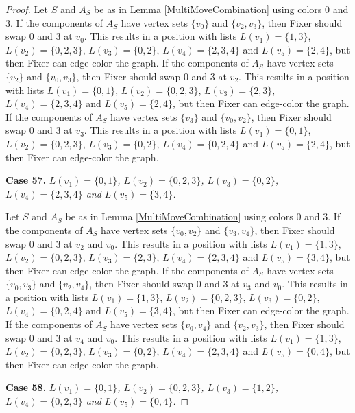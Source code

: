\documentclass[12pt]{amsart}
\theoremstyle{plain}
\theoremstyle{definition}
\theoremstyle{remark}
\begin{document}
\begin{proof}
Let $S$ and $A_S$ be as in Lemma \ref{MultiMoveCombination} using colors $0$ and $3$. If the components of $A_S$ have vertex sets $\{v_0\}$ and $\{v_2, v_3\}$, then Fixer should swap 0 and 3 at $v_0$. This results in a position with lists $L(v_1) = \{1, 3\}$, $L(v_2) = \{0, 2, 3\}$, $L(v_3) = \{0, 2\}$, $L(v_4) = \{2, 3, 4\}$ and $L(v_5) = \{2, 4\}$, but then Fixer can edge-color the graph.
If the components of $A_S$ have vertex sets $\{v_2\}$ and $\{v_0, v_3\}$, then Fixer should swap 0 and 3 at $v_2$. This results in a position with lists $L(v_1) = \{0, 1\}$, $L(v_2) = \{0, 2, 3\}$, $L(v_3) = \{2, 3\}$, $L(v_4) = \{2, 3, 4\}$ and $L(v_5) = \{2, 4\}$, but then Fixer can edge-color the graph.
If the components of $A_S$ have vertex sets $\{v_3\}$ and $\{v_0, v_2\}$, then Fixer should swap 0 and 3 at $v_3$. This results in a position with lists $L(v_1) = \{0, 1\}$, $L(v_2) = \{0, 2, 3\}$, $L(v_3) = \{0, 2\}$, $L(v_4) = \{0, 2, 4\}$ and $L(v_5) = \{2, 4\}$, but then Fixer can edge-color the graph.

\noindent\textbf{Case 57.  }\textit{$L(v_1) = \{0, 1\}$, $L(v_2) = \{0, 2, 3\}$, $L(v_3) = \{0, 2\}$, $L(v_4) = \{2, 3, 4\}$ and $L(v_5) = \{3, 4\}$.}

Let $S$ and $A_S$ be as in Lemma \ref{MultiMoveCombination} using colors $0$ and $3$. If the components of $A_S$ have vertex sets $\{v_0, v_2\}$ and $\{v_3, v_4\}$, then Fixer should swap 0 and 3 at $v_2$ and $v_0$. This results in a position with lists $L(v_1) = \{1, 3\}$, $L(v_2) = \{0, 2, 3\}$, $L(v_3) = \{2, 3\}$, $L(v_4) = \{2, 3, 4\}$ and $L(v_5) = \{3, 4\}$, but then Fixer can edge-color the graph.
If the components of $A_S$ have vertex sets $\{v_0, v_3\}$ and $\{v_2, v_4\}$, then Fixer should swap 0 and 3 at $v_3$ and $v_0$. This results in a position with lists $L(v_1) = \{1, 3\}$, $L(v_2) = \{0, 2, 3\}$, $L(v_3) = \{0, 2\}$, $L(v_4) = \{0, 2, 4\}$ and $L(v_5) = \{3, 4\}$, but then Fixer can edge-color the graph.
If the components of $A_S$ have vertex sets $\{v_0, v_4\}$ and $\{v_2, v_3\}$, then Fixer should swap 0 and 3 at $v_4$ and $v_0$. This results in a position with lists $L(v_1) = \{1, 3\}$, $L(v_2) = \{0, 2, 3\}$, $L(v_3) = \{0, 2\}$, $L(v_4) = \{2, 3, 4\}$ and $L(v_5) = \{0, 4\}$, but then Fixer can edge-color the graph.

\noindent\textbf{Case 58.  }\textit{$L(v_1) = \{0, 1\}$, $L(v_2) = \{0, 2, 3\}$, $L(v_3) = \{1, 2\}$, $L(v_4) = \{0, 2, 3\}$ and $L(v_5) = \{0, 4\}$.}


\end{proof}
\end{document}
